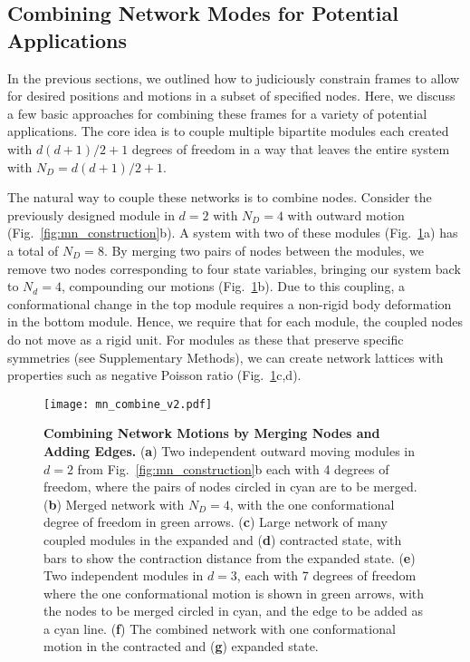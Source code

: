 \documentclass[%
preprint,
 amsmath,amssymb,
 aps,
]{revtex4-1}
\begin{document}
\subsection{Combining Network Modes for Potential Applications}

In the previous sections, we outlined how to judiciously constrain frames to allow for desired positions and motions in a subset of specified nodes. Here, we discuss a few basic approaches for combining these frames for a variety of potential applications. The core idea is to couple multiple bipartite modules each created with $d(d+1)/2 + 1$ degrees of freedom in a way that leaves the entire system with $N_D = d(d+1)/2 + 1$.

The natural way to couple these networks is to combine nodes. Consider the previously designed module in $d=2$ with $N_D = 4$ with outward motion (Fig.~\ref{fig:mn_construction}b). A system with two of these modules (Fig.~\ref{fig:mn_combine}a) has a total of $N_D = 8$. By merging two pairs of nodes between the modules, we remove two nodes corresponding to four state variables, bringing our system back to $N_d = 4$, compounding our motions (Fig.~\ref{fig:mn_combine}b). Due to this coupling, a conformational change in the top module requires a non-rigid body deformation in the bottom module. Hence, we require that for each module, the coupled nodes do not move as a rigid unit. For modules as these that preserve specific symmetries (see Supplementary Methods), we can create network lattices with properties such as negative Poisson ratio (Fig.~\ref{fig:mn_combine}c,d).

\begin{figure}[h!]
	\centering
	\texttt{[image: mn\_combine\_v2.pdf]}
	\caption{\textbf{Combining Network Motions by Merging Nodes and Adding Edges.} (\textbf{a}) Two independent outward moving modules in $d=2$ from Fig.~\ref{fig:mn_construction}b each with 4 degrees of freedom, where the pairs of nodes circled in cyan are to be merged. (\textbf{b}) Merged network with $N_D = 4$, with the one conformational degree of freedom in green arrows. (\textbf{c}) Large network of many coupled modules in the expanded and (\textbf{d}) contracted state, with bars to show the contraction distance from the expanded state. (\textbf{e}) Two independent modules in $d=3$, each with 7 degrees of freedom where the one conformational motion is shown in green arrows, with the nodes to be merged circled in cyan, and the edge to be added as a cyan line. (\textbf{f}) The combined network with one conformational motion in the contracted and (\textbf{g}) expanded state.}
	\label{fig:mn_combine}
\end{figure}
\end{document}
